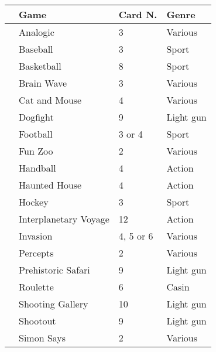 \documentclass[a4paper,10pt]{book}
\begin{document}
 \begin{longtable}{p{1mm}|l|l|l|}\hline
 
 & \textbf{Game } 
 & \textbf{Card N. } 
 & \textbf{Genre } 
 \\\hline
 
 & Analogic 
 & 3 
 & Various 
 \\\hline
 
 & Baseball 
 & 3 
 & Sport 
 \\\hline
 
 & Basketball 
 & 8 
 & Sport 
 \\\hline
 
 & Brain Wave 
 & 3 
 & Various 
 \\\hline
 
 & Cat and Mouse 
 & 4 
 & Various 
 \\\hline
 
 & Dogfight 
 & 9 
 & Light gun 
 \\\hline
 
 & Football 
 & 3 or 4 
 & Sport 
 \\\hline
 
 & Fun Zoo 
 & 2 
 & Various 
 \\\hline
 
 & Handball 
 & 4 
 & Action 
 \\\hline
 
 & Haunted House 
 & 4 
 & Action 
 \\\hline
 
 & Hockey 
 & 3 
 & Sport 
 \\\hline
 
 & Interplanetary Voyage 
 & 12 
 & Action 
 \\\hline
 
 & Invasion 
 & 4, 5 or 6 
 & Various 
 \\\hline
 
 & Percepts 
 & 2 
 & Various 
 \\\hline
 
 & Prehistoric Safari 
 & 9 
 & Light gun 
 \\\hline
 
 & Roulette 
 & 6 
 & Casin 
 \\\hline
 
 & Shooting Gallery 
 & 10 
 & Light gun 
 \\\hline
 
 & Shootout 
 & 9 
 & Light gun 
 \\\hline
 
 & Simon Says 
 & 2 
 & Various 
 \\\hline
 

\end{longtable}
\end{document}
